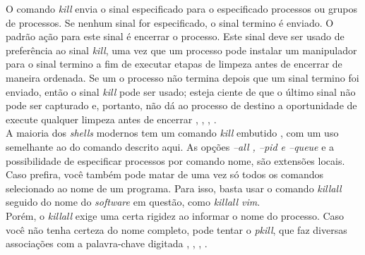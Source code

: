 O comando \emph{kill} envia o sinal especificado para o especificado processos ou grupos de processos.
Se nenhum sinal for especificado, o sinal termino é enviado. O padrão ação para este sinal é encerrar o processo. Este sinal deve ser usado de preferência ao sinal \emph{kill}, uma vez que um processo pode instalar um manipulador para o sinal termino a fim de executar etapas de limpeza antes de encerrar de maneira ordenada. Se um o processo não termina depois que um sinal termino foi enviado, então o sinal \emph{kill} pode ser usado; esteja ciente de que o último sinal não pode ser capturado e, portanto, não dá ao processo de destino a oportunidade de execute qualquer limpeza antes de encerrar \cite{Tanenbaum2016}, \cite{info2020}, \cite{Morimoto2011}, \cite{Man2020}.\\
A maioria dos \emph{shells} modernos tem um comando \emph{kill} embutido , com um uso semelhante ao do comando descrito aqui. As opções \emph{--all , --pid e --queue} e a possibilidade de especificar processos por comando nome, são extensões locais.\\
Caso prefira, você também pode matar de uma vez só todos os comandos selecionado ao nome de um programa. Para isso, basta usar o comando \emph{killall} seguido do nome do \emph{software} em questão, como \emph{killall vim}.\\
Porém, o \emph{killall} exige uma certa rigidez ao informar o nome do processo. Caso você não tenha certeza do nome completo, pode tentar o \emph{pkill}, que faz diversas associações com a palavra-chave digitada \cite{Tanenbaum2016}, \cite{info2020}, \cite{Morimoto2011}, \cite{Man2020}.\\
